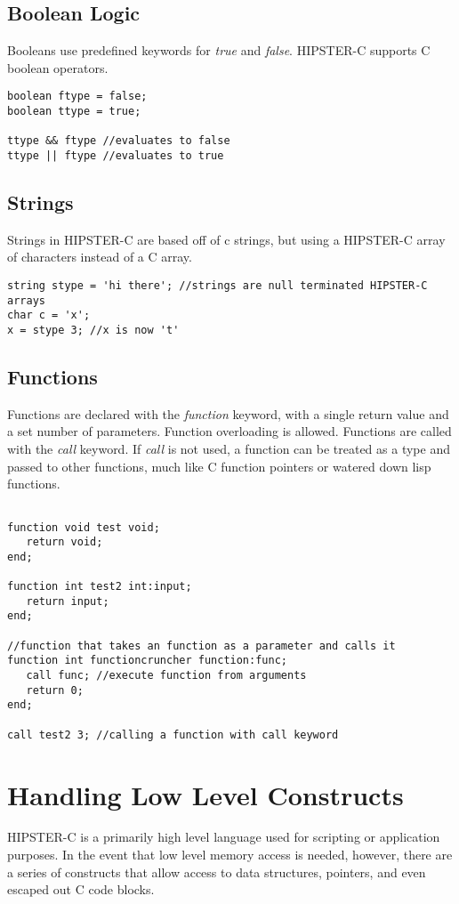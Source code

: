 \documentclass{article}
\begin{document}
\subsection{Boolean Logic}
Booleans use predefined keywords for \textit{true} and \textit{false}. HIPSTER-C supports C boolean operators. 
\begin{verbatim}
boolean ftype = false; 
boolean ttype = true; 

ttype && ftype //evaluates to false
ttype || ftype //evaluates to true
\end{verbatim}


\subsection{Strings}
Strings in HIPSTER-C are based off of c strings, but using a HIPSTER-C array of characters instead of a C array. 
\begin{verbatim}
string stype = 'hi there'; //strings are null terminated HIPSTER-C arrays
char c = 'x';
x = stype 3; //x is now 't'
\end{verbatim}


\subsection{Functions}
Functions are declared with the \textit{function} keyword, with a single return value and a set number of parameters. Function overloading is allowed. Functions are called with the \textit{call} keyword. If \textit{call} is not used, a function can be treated as a type and passed to other functions, much like C function pointers or watered down lisp functions. 
\begin{verbatim}

function void test void; 
   return void;
end;

function int test2 int:input; 
   return input;
end;

//function that takes an function as a parameter and calls it
function int functioncruncher function:func;
   call func; //execute function from arguments 
   return 0;
end; 

call test2 3; //calling a function with call keyword
\end{verbatim}



\section{Handling Low Level Constructs}
HIPSTER-C is a primarily high level language used for scripting or application purposes. In the event that low level memory access is needed, however, there are a series of constructs that allow access to data structures, pointers, and even escaped out C code blocks. 
\end{document}
